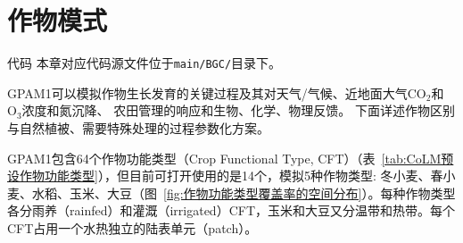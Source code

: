 \chapter{作物模式}
\begin{mymdframed}{代码}
本章对应代码源文件位于\texttt{main/BGC/}目录下。
\end{mymdframed}

GPAM1可以模拟作物生长发育的关键过程及其对天气/气候、近地面大气$\mathrm{CO_2}$和$\mathrm{O_3}$浓度和氮沉降、
农田管理的响应和生物、化学、物理反馈。
下面详述作物区别与自然植被、需要特殊处理的过程参数化方案。

GPAM1包含64个作物功能类型（Crop Functional Type, CFT）（表~\ref{tab:CoLM预设作物功能类型}），但目前可打开使用的是14个，模拟5种作物类型: 冬小麦、春小麦、水稻、玉米、大豆（图~\ref{fig:作物功能类型覆盖率的空间分布}）。每种作物类型各分雨养（rainfed）和灌溉（irrigated）CFT，玉米和大豆又分温带和热带。每个CFT占用一个水热独立的陆表单元（patch）。
